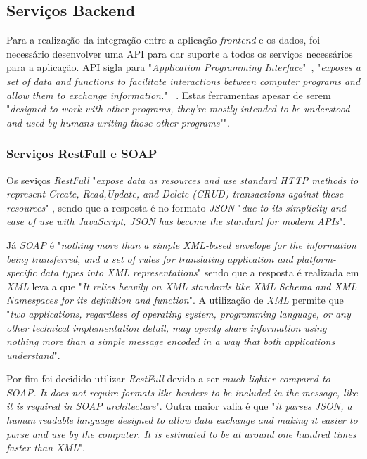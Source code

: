 \subsection{Serviços Backend}

Para a realização da integração entre a aplicação \emph{frontend} e os dados, foi necessário desenvolver uma API para dar suporte a todos os serviços necessários para a aplicação.
API sigla para "\emph{Application Programming Interface}"~\citep{rest_cookbook}, "\emph{exposes a set of data and functions to facilitate interactions between computer programs and allow them to exchange information.}" ~\citep{rest_cookbook}.
Estas ferramentas apesar de serem "\emph{designed  to  work  with  other  programs,  they’re  mostly intended to be understood and used by humans writing those other programs}"\citep{api_design}".

\newpage

\subsubsection{Serviços RestFull e SOAP}
Os seviços \emph{RestFull} "\emph{expose data as resources  and  use  standard  HTTP  methods  to  represent  Create,  Read,Update,  and  Delete  (CRUD)  transactions  against  these  resources}"
\citep{api_design}, sendo que a resposta é no formato \emph{JSON} "\emph{due  to  its  simplicity  and  ease  of  use  with  JavaScript,  JSON  has become the standard for modern APIs}"\citep{api_design}.

Já \emph{SOAP} é "\emph{nothing  more  than  a  simple  XML-based  envelope  for  the  information  being  transferred,  and  a  set  of  rules  for  translating  application and platform-specific data types into XML representations}"\citep{Snell2002} sendo que a resposta é realizada em \emph{XML} leva a que "\emph{It relies heavily on XML  standards  like  XML  Schema  and  XML  Namespaces  for  its  definition  and  function}"\citep{Snell2002}. A utilização de \emph{XML} permite que "\emph{two  applications,  regardless  of  operating  system,  programming  language,  or  any  other  technical  implementation  detail,  may  openly  share  information  using  nothing  more  than  a  simple  message  encoded  in  a  way  that  both  applications  understand}"\citep{Snell2002}.

Por fim foi decidido utilizar \emph{RestFull} devido a ser \emph{much lighter compared to SOAP. It does not require formats like headers to be included in the message, like it is required in SOAP architecture}"\citep{Halili2018}. Outra maior valia é que "\emph{it parses JSON, a human readable language designed to allow data exchange and making it easier to parse and use by the computer. It is estimated to be at around one hundred times faster than XML}"\citep{Halili2018}.

